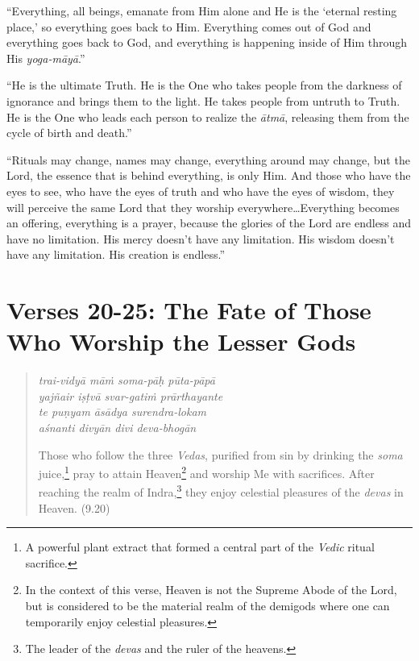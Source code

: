 \documentclass[12pt, twoside, openright]{memoir}
\begin{document}
\enquote{Everything, all beings, emanate from Him alone and He is the \enquote{eternal resting place,} so everything goes back to Him. Everything comes out of God and everything goes back to God, and everything is happening inside of Him through His \textit{yoga-māyā}.}

\enquote{He is the ultimate Truth. He is the One who takes people from the darkness of ignorance and brings them to the light. He takes people from untruth to Truth. He is the One who leads each person to realize the \textit{ātmā}, releasing them from the cycle of birth and death.}

\enquote{Rituals may change, names may change, everything around may change, but the Lord, the essence that is behind everything, is only Him. And those who have the eyes to see, who have the eyes of truth and who have the eyes of wisdom, they will perceive the same Lord that they worship everywhere\ldots Everything becomes an offering, everything is a prayer, because the glories of the Lord are endless and have no limitation. His mercy doesn’t have any limitation. His wisdom doesn’t have any limitation. His creation is endless.}

\section{Verses 20-25: The Fate of Those Who Worship the Lesser Gods}\label{sec-verses-20-25-the-fate-of-those-who-worship-the-lesser-gods}


\par
\begin{verse}
\textit{trai-vidyā māṁ soma-pāḥ pūta-pāpā} \\
\textit{yajñair iṣṭvā svar-gatiṁ prārthayante} \\
\textit{te puṇyam āsādya surendra-lokam} \\
\textit{aśnanti divyān divi deva-bhogān}

\noindent Those who follow the three \textit{Vedas}, purified from sin by drinking the \textit{soma} juice,\footnote{A powerful plant extract that formed a central part of the \textit{Vedic} ritual sacrifice.} pray to attain Heaven\footnote{In the context of this verse, Heaven is not the Supreme Abode of the Lord, but is considered to be the material realm of the demigods where one can temporarily enjoy celestial pleasures.} and worship Me with sacrifices. After reaching the realm of Indra,\footnote{The leader of the \textit{devas} and the ruler of the heavens.} they enjoy celestial pleasures of the \textit{devas} in Heaven. (9.20)
\end{verse}
\par
\end{document}
